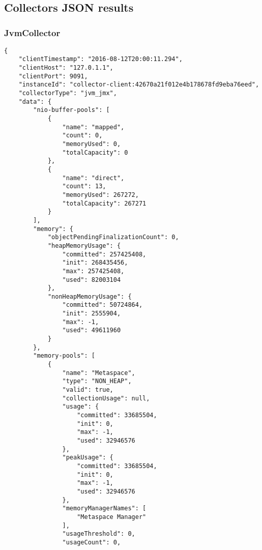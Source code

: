 \appendix

\chapter{}

\section{Collectors JSON results}
\subsection{JvmCollector}
\begin{lstlisting}[caption={"JvmCollector" JSON result, abbreviated}, captionpos=b, label={lst:json-jvm}]
{
    "clientTimestamp": "2016-08-12T20:00:11.294",
    "clientHost": "127.0.1.1",
    "clientPort": 9091,
    "instanceId": "collector-client:42670a21f012e4b178678fd9eba76eed",
    "collectorType": "jvm_jmx",
    "data": {
        "nio-buffer-pools": [
            {
                "name": "mapped",
                "count": 0,
                "memoryUsed": 0,
                "totalCapacity": 0
            },
            {
                "name": "direct",
                "count": 13,
                "memoryUsed": 267272,
                "totalCapacity": 267271
            }
        ],
        "memory": {
            "objectPendingFinalizationCount": 0,
            "heapMemoryUsage": {
                "committed": 257425408,
                "init": 268435456,
                "max": 257425408,
                "used": 82003104
            },
            "nonHeapMemoryUsage": {
                "committed": 50724864,
                "init": 2555904,
                "max": -1,
                "used": 49611960
            }
        },
        "memory-pools": [
            {
                "name": "Metaspace",
                "type": "NON_HEAP",
                "valid": true,
                "collectionUsage": null,
                "usage": {
                    "committed": 33685504,
                    "init": 0,
                    "max": -1,
                    "used": 32946576
                },
                "peakUsage": {
                    "committed": 33685504,
                    "init": 0,
                    "max": -1,
                    "used": 32946576
                },
                "memoryManagerNames": [
                    "Metaspace Manager"
                ],
                "usageThreshold": 0,
                "usageCount": 0,

\end{lstlisting}

